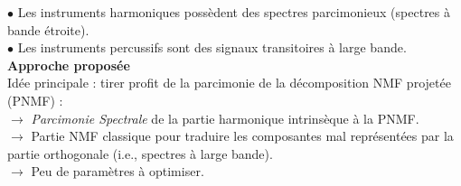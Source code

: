 \documentclass[a0paper,portrait]{baposter}
\begin{document}
\begin{poster}
{\textcolor{bgcol}{$\bullet$} Les instruments harmoniques possèdent des spectres parcimonieux (spectres à bande étroite).\\
\textcolor{bgcol}{$\bullet$} Les instruments percussifs sont des signaux transitoires à large bande. \\

\large\textbf{Approche proposée} \normalsize \\
Idée principale : tirer profit de la parcimonie de la décomposition NMF projetée (PNMF) : \\
\textcolor{bgcol}{$\rightarrow$} \textit{Parcimonie Spectrale} de la partie harmonique intrinsèque à la PNMF. \\
\textcolor{bgcol}{$\rightarrow$} Partie NMF classique pour traduire les composantes mal représentées par la partie orthogonale (i.e., spectres à large bande). \\
\textcolor{bgcol}{$\rightarrow$} Peu de paramètres à optimiser. \\
\vspace{-1em} 
}



\end{poster}
\end{document}
